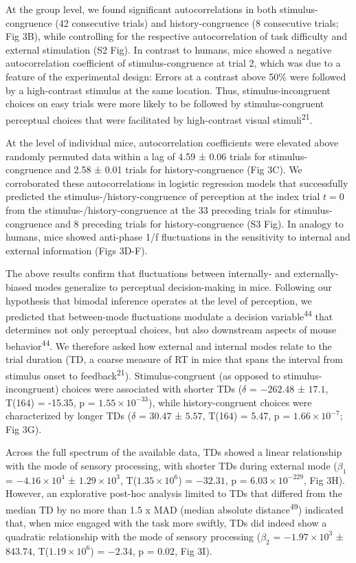 \documentclass[
]{article}
\begin{document}
At the group level, we found significant autocorrelations in both
stimulus-congruence (42 consecutive trials) and history-congruence (8
consecutive trials; Fig 3B), while controlling for the respective
autocorrelation of task difficulty and external stimulation
(S2 Fig). In contrast to humans, mice showed a
negative autocorrelation coefficient of stimulus-congruence at trial 2,
which was due to a feature of the experimental design: Errors at a
contrast above 50\% were followed by a high-contrast stimulus at the
same location. Thus, stimulus-incongruent choices on easy trials were
more likely to be followed by stimulus-congruent perceptual choices that
were facilitated by high-contrast visual stimuli\textsuperscript{21}.

At the level of individual mice, autocorrelation coefficients were
elevated above randomly permuted data within a lag of 4.59 ± 0.06 trials
for stimulus-congruence and 2.58 ± 0.01 trials for history-congruence
(Fig 3C). We corroborated these autocorrelations in logistic
regression models that successfully predicted the
stimulus-/history-congruence of perception at the index trial \(t = 0\)
from the stimulus-/history-congruence at the 33 preceding trials for
stimulus-congruence and 8 preceding trials for history-congruence
(S3 Fig). In analogy to humans, mice showed anti-phase
1/f fluctuations in the sensitivity to internal and external information
(Figs 3D-F).

The above results confirm that fluctuations between internally- and
externally-biased modes generalize to perceptual decision-making in
mice. Following our hypothesis that bimodal inference operates at the
level of perception, we predicted that between-mode fluctuations
modulate a decision variable\textsuperscript{44} that determines not
only perceptual choices, but also downstream aspects of mouse
behavior\textsuperscript{44}. We therefore asked how external and
internal modes relate to the trial duration (TD, a coarse measure of RT
in mice that spans the interval from stimulus onset to
feedback\textsuperscript{21}). Stimulus-congruent (as opposed to
stimulus-incongruent) choices were associated with shorter TDs
(\(\delta\) = \(-262.48\) ± \(17.1\), T(164) = -15.35, p =
\(\ensuremath{1.55\times 10^{-33}}\)), while history-congruent choices
were characterized by longer TDs (\(\delta\) = \(30.47\) ± \(5.57\),
T(164) = 5.47, p = \(\ensuremath{1.66\times 10^{-7}}\); Fig 3G).

Across the full spectrum of the available data, TDs showed a linear
relationship with the mode of sensory processing, with shorter TDs
during external mode (\(\beta_1\) = \(\ensuremath{-4.16\times 10^{4}}\)
± \(\ensuremath{1.29\times 10^{3}}\),
T(\(\ensuremath{1.35\times 10^{6}}\)) = \(-32.31\), p =
\(\ensuremath{6.03\times 10^{-229}}\), Fig 3H). However, an
explorative post-hoc analysis limited to TDs that differed from the
median TD by no more than 1.5 x MAD (median absolute
distance\textsuperscript{49}) indicated that, when mice engaged with the
task more swiftly, TDs did indeed show a quadratic relationship with the
mode of sensory processing (\(\beta_2\) =
\(\ensuremath{-1.97\times 10^{3}}\) ± \(843.74\),
T(\(\ensuremath{1.19\times 10^{6}}\)) = \(-2.34\), p = \(0.02\), Fig
3I).
\end{document}
